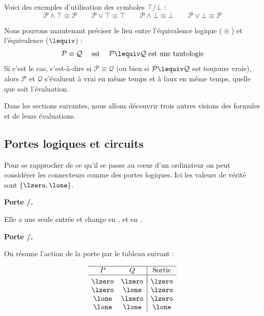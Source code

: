 \documentclass[11pt,class=report,crop=false]{standalone}
\begin{document}
Voici des exemples d'utilisation des symboles $\top/\bot$ :
\[
\mathcal{P} \land \top \equiv \mathcal{P} \qquad
\mathcal{P} \lor \top \equiv \top \qquad
\mathcal{P} \land \bot \equiv \bot \qquad
\mathcal{P} \lor \bot \equiv \mathcal{P}
\]


Nous pouvons maintenant préciser le lien entre l'équivalence logique ($\equiv$) et l'équivalence ($\lequiv$) :
\[
\mathcal{P} \equiv \mathcal{Q} \quad \text{ ssi } \quad
\mathcal{P} \lequiv \mathcal{Q} \text{ est une tautologie}
\]
Si c'est le cas, c'est-à-dire si $\mathcal{P} \equiv \mathcal{Q}$ (ou bien si $\mathcal{P} \lequiv \mathcal{Q}$ est toujours vraie), alors $\mathcal{P}$ et $\mathcal{Q}$ s'évaluent à vrai en même temps et à faux en même temps, quelle que soit l'évaluation.

\medskip
Dans les sections suivantes, nous allons découvrir trois autres visions des formules et de leurs évaluations.

\subsection{Portes logiques et circuits}

Pour se rapprocher de ce qu'il se passe au cœur d'un ordinateur on peut considérer les connecteurs comme des portes logiques. Ici les valeurs de vérité sont $\{\lzero, \lone\}$.


\textbf{Porte \tnot/.}

Elle a une seule entrée et change \lzero{} en \lone, et \lone{} en \lzero.

\textbf{Porte \tand/.}


On résume l'action de la porte  par le tableau suivant :

\begin{center}
	\begin{minipage}{0.45\textwidth}
		\[			
			\begin{array}{cc|c}
				\hline
				P & Q & \text{Sortie} \\ \hline
				&&	\\[-2ex]
				\lzero & \lzero & \lzero \\
				\lzero & \lone & \lzero \\
				\lone & \lzero & \lzero \\
				\lone & \lone & \lone \\ 
			\end{array}
	\]
	\end{minipage}
	\begin{minipage}{0.45\textwidth}
	\end{minipage}
\end{center}
\end{document}
